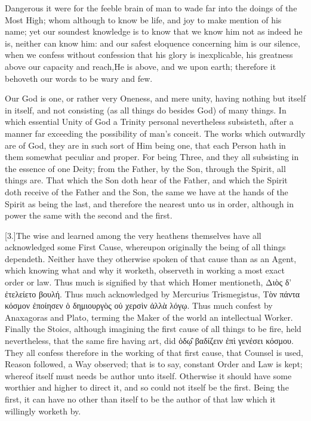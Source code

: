 Dangerous it were for the feeble brain of man to wade far into the doings of the Most High; whom although to know be life, and joy to make mention of his name; yet our soundest knowledge is to know that we know him not as indeed he is, neither can know him: and our safest eloquence concerning him is our silence, when we confess without confession that his glory is inexplicable, his greatness above our capacity and reach,He is above, and we upon earth; therefore it behoveth our words to be wary and few.

Our God is one, or rather very Oneness, and mere unity, having nothing but itself in itself, and not consisting (as all things do besides God) of many things. In which essential Unity of God a Trinity personal nevertheless subsisteth, after a manner far exceeding the possibility of man’s conceit. The works which outwardly are of God, they are in such sort of Him being one, that each Person hath in them somewhat peculiar and proper. For being Three, and they all subsisting in the essence of one Deity; from the Father, by the Son, through the Spirit, all things are. That which the Son doth hear of the Father, and which the Spirit doth receive of the Father and the Son, the same we have at the hands of the Spirit as being the last, and therefore the nearest unto us in order, although in power the same with the second and the first.

[3.]The wise and learned among the very heathens themselves have all acknowledged some First Cause, whereupon originally the being of all things dependeth. Neither have they otherwise spoken of that cause than as an Agent, which knowing what and why it worketh, observeth in working a most exact order or law. Thus much is signified by that which Homer mentioneth, Διὸς δ’ ἐτελείετο βουλή. Thus  much acknowledged by Mercurius Trismegistus, Τὸν πάντα κόσμον ἐποίησεν ὁ δημιουργὸς οὐ χερσὶν ἀλλὰ λόγῳ. Thus much confest by Anaxagoras and Plato, terming the Maker of the world an intellectual Worker. Finally the Stoics, although imagining the first cause of all things to be fire, held nevertheless, that the same fire having art, did ὁδῳ̑ βαδίζειν ἐπὶ γενέσει κόσμου. They all confess therefore in the working of that first cause, that Counsel is used, Reason followed, a Way observed; that is to say, constant Order and Law is kept; whereof itself must needs be author unto itself. Otherwise it should have some worthier and higher to direct it, and so could not itself be the first. Being the first, it can have no other than itself to be the author of that law which it willingly worketh by.

